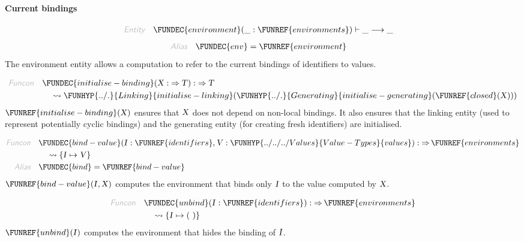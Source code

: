 \paragraph{Current bindings}\hypertarget{current-bindings}{}\label{current-bindings}

\begin{align*}
  \KEY{Entity} \quad
  & \FUNDEC{environment}(\_ : \FUNREF{environments}) \vdash \_ \TRANS  \_
\end{align*}
\begin{align*}
  \KEY{Alias} \quad
  & \FUNDEC{env} = \FUNREF{environment}
\end{align*}
The environment entity allows a computation to refer to the current bindings
  of identifiers to values.

\begin{align*}
  \KEY{Funcon} \quad
  & \FUNDEC{initialise-binding}(
                     \VAR{X} :  \TO \VAR{T}) 
    :  \TO \VAR{T} \\&\quad
    \leadsto \FUNHYP{../.}{Linking}{initialise-linking}
               (  \FUNHYP{../.}{Generating}{initialise-generating}
                       (  \FUNREF{closed}
                               (  \VAR{X} ) ) )
\end{align*}
$\FUNREF{initialise-binding}
    (  \VAR{X} )$ ensures that $\VAR{X}$ does not depend on non-local bindings.
  It also ensures that the linking entity (used to represent potentially cyclic
  bindings) and the generating entity (for creating fresh identifiers) are 
  initialised.

\begin{align*}
  \KEY{Funcon} \quad
  & \FUNDEC{bind-value}(
                     \VAR{I} : \FUNREF{identifiers}, \VAR{V} : \FUNHYP{../../../Values}{Value-Types}{values}) 
    :  \TO \FUNREF{environments} \\&\quad
    \leadsto \{ \VAR{I} \mapsto 
                  \VAR{V} \}
\\
  \KEY{Alias} \quad
  & \FUNDEC{bind} = \FUNREF{bind-value}
\end{align*}
$\FUNREF{bind-value}
    (  \VAR{I}, 
           \VAR{X} )$ computes the environment that binds only $\VAR{I}$ to the value
  computed by $\VAR{X}$.

\begin{align*}
  \KEY{Funcon} \quad
  & \FUNDEC{unbind}(
                     \VAR{I} : \FUNREF{identifiers}) 
    :  \TO \FUNREF{environments} \\&\quad
    \leadsto \{ \VAR{I} \mapsto 
                  (   \  ) \}
\end{align*}
$\FUNREF{unbind}
    (  \VAR{I} )$ computes the environment that hides the binding of $\VAR{I}$.

